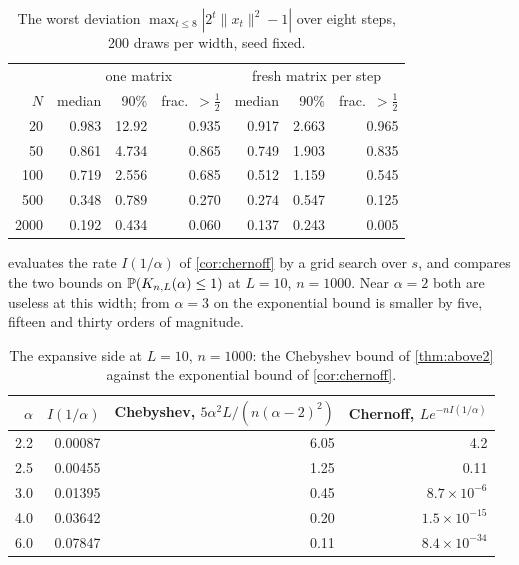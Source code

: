 \begin{table}[h]\centering
\begin{tabular}{rrrrrrr}
\toprule
 & \multicolumn{3}{c}{one matrix} & \multicolumn{3}{c}{fresh matrix per step}\\
$N$ & median & 90\% & frac.\ $>\tfrac12$ & median & 90\% & frac.\ $>\tfrac12$\\
\midrule
20 & 0.983 & 12.92 & 0.935 & 0.917 & 2.663 & 0.965\\
50 & 0.861 & 4.734 & 0.865 & 0.749 & 1.903 & 0.835\\
100 & 0.719 & 2.556 & 0.685 & 0.512 & 1.159 & 0.545\\
500 & 0.348 & 0.789 & 0.270 & 0.274 & 0.547 & 0.125\\
2000 & 0.192 & 0.434 & 0.060 & 0.137 & 0.243 & 0.005\\
\bottomrule
\end{tabular}
\caption{The worst deviation $\max_{t\le8}|2^t\|x_t\|^2-1|$ over eight steps, 200 draws per width, seed fixed.}
\label{tab:horizon}
\end{table}

 evaluates the rate $I(1/\alpha)$ of \cref{cor:chernoff} by a grid search over $s$, and compares the two bounds on $\mathbb{P}(K_{n,L}(\alpha)\le1)$ at $L=10$, $n=1000$. Near $\alpha=2$ both are useless at this width; from $\alpha=3$ on the exponential bound is smaller by five, fifteen and thirty orders of magnitude.

\begin{table}[h]\centering
\begin{tabular}{rrrr}
\toprule
$\alpha$ & $I(1/\alpha)$ & Chebyshev, $5\alpha^2L/(n(\alpha-2)^2)$ & Chernoff, $Le^{-nI(1/\alpha)}$\\
\midrule
2.2 & 0.00087 & 6.05 & 4.2\\
2.5 & 0.00455 & 1.25 & 0.11\\
3.0 & 0.01395 & 0.45 & $8.7\times10^{-6}$\\
4.0 & 0.03642 & 0.20 & $1.5\times10^{-15}$\\
6.0 & 0.07847 & 0.11 & $8.4\times10^{-34}$\\
\bottomrule
\end{tabular}
\caption{The expansive side at $L=10$, $n=1000$: the Chebyshev bound of \cref{thm:above2} against the exponential bound of \cref{cor:chernoff}.}
\label{tab:chernoff}
\end{table}
